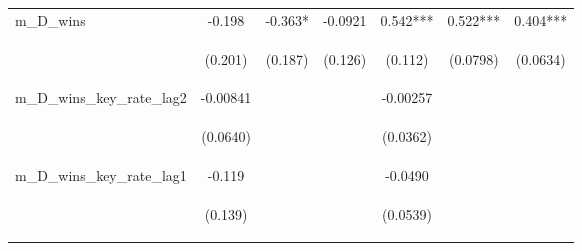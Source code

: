 \documentclass[]{article}
\begin{document}
\begin{center}
\begin{tabular}{lcccccc}
m\_D\_wins & -0.198 & -0.363* & -0.0921 & 0.542*** & 0.522*** & 0.404*** \\
\vspace{4pt} & \begin{footnotesize}(0.201)\end{footnotesize} & \begin{footnotesize}(0.187)\end{footnotesize} & \begin{footnotesize}(0.126)\end{footnotesize} & \begin{footnotesize}(0.112)\end{footnotesize} & \begin{footnotesize}(0.0798)\end{footnotesize} & \begin{footnotesize}(0.0634)\end{footnotesize} \\
m\_D\_wins\_key\_rate\_lag2 & -0.00841 &  &  & -0.00257 &  &  \\
\vspace{4pt} & \begin{footnotesize}(0.0640)\end{footnotesize} & \begin{footnotesize}\end{footnotesize} & \begin{footnotesize}\end{footnotesize} & \begin{footnotesize}(0.0362)\end{footnotesize} & \begin{footnotesize}\end{footnotesize} & \begin{footnotesize}\end{footnotesize} \\
m\_D\_wins\_key\_rate\_lag1 & -0.119 &  &  & -0.0490 &  &  \\
\vspace{4pt} & \begin{footnotesize}(0.139)\end{footnotesize} & \begin{footnotesize}\end{footnotesize} & \begin{footnotesize}\end{footnotesize} & \begin{footnotesize}(0.0539)\end{footnotesize} & \begin{footnotesize}\end{footnotesize} & \begin{footnotesize}\end{footnotesize} \\

\end{tabular}
\end{center}
\end{document}
